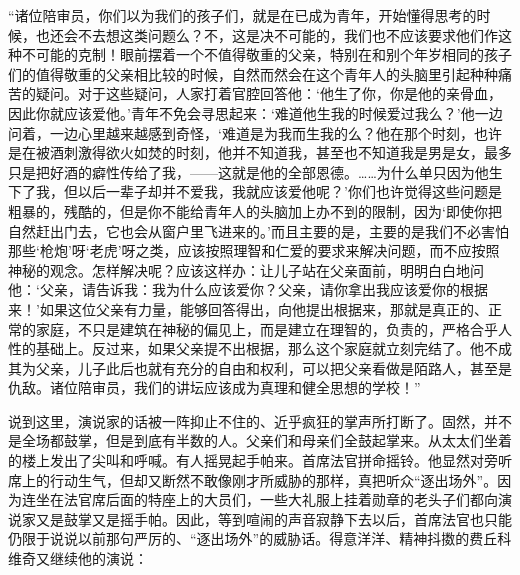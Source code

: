 \par “诸位陪审员，你们以为我们的孩子们，就是在已成为青年，开始懂得思考的时候，也还会不去想这类问题么？不，这是决不可能的，我们也不应该要求他们作这种不可能的克制！眼前摆着一个不值得敬重的父亲，特别在和别个年岁相同的孩子们的值得敬重的父亲相比较的时候，自然而然会在这个青年人的头脑里引起种种痛苦的疑问。对于这些疑问，人家打着官腔回答他：‘他生了你，你是他的亲骨血，因此你就应该爱他。’青年不免会寻思起来：‘难道他生我的时候爱过我么？’他一边问着，一边心里越来越感到奇怪，‘难道是为我而生我的么？他在那个时刻，也许是在被酒刺激得欲火如焚的时刻，他并不知道我，甚至也不知道我是男是女，最多只是把好酒的癖性传给了我，——这就是他的全部恩德。……为什么单只因为他生下了我，但以后一辈子却并不爱我，我就应该爱他呢？’你们也许觉得这些问题是粗暴的，残酷的，但是你不能给青年人的头脑加上办不到的限制，因为‘即使你把自然赶出门去，它也会从窗户里飞进来的。’而且主要的是，主要的是我们不必害怕那些‘枪炮’呀‘老虎’呀之类，应该按照理智和仁爱的要求来解决问题，而不应按照神秘的观念。怎样解决呢？应该这样办：让儿子站在父亲面前，明明白白地问他：‘父亲，请告诉我：我为什么应该爱你？父亲，请你拿出我应该爱你的根据来！’如果这位父亲有力量，能够回答得出，向他提出根据来，那就是真正的、正常的家庭，不只是建筑在神秘的偏见上，而是建立在理智的，负责的，严格合乎人性的基础上。反过来，如果父亲提不出根据，那么这个家庭就立刻完结了。他不成其为父亲，儿子此后也就有充分的自由和权利，可以把父亲看做是陌路人，甚至是仇敌。诸位陪审员，我们的讲坛应该成为真理和健全思想的学校！”
\par 说到这里，演说家的话被一阵抑止不住的、近乎疯狂的掌声所打断了。固然，并不是全场都鼓掌，但是到底有半数的人。父亲们和母亲们全鼓起掌来。从太太们坐着的楼上发出了尖叫和呼喊。有人摇晃起手帕来。首席法官拼命摇铃。他显然对旁听席上的行动生气，但却又断然不敢像刚才所威胁的那样，真把听众“逐出场外”。因为连坐在法官席后面的特座上的大员们，一些大礼服上挂着勋章的老头子们都向演说家又是鼓掌又是摇手帕。因此，等到喧闹的声音寂静下去以后，首席法官也只能仍限于说说以前那句严厉的、“逐出场外”的威胁话。得意洋洋、精神抖擞的费丘科维奇又继续他的演说：
